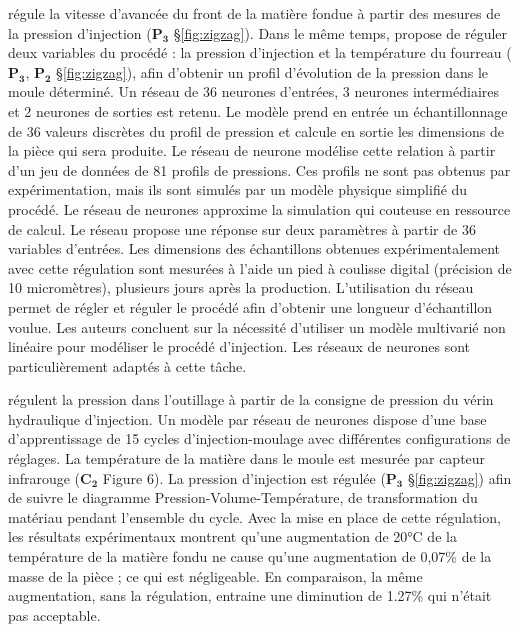 \cite{demirci_numerical_1997} régule la vitesse d'avancée du front de la matière fondue à partir des mesures de la pression d'injection ($\boldsymbol{P_3}$ §\ref{fig:zigzag}).
Dans le même temps, \cite{woll_pattern-based_1997} propose de réguler deux variables du procédé : la pression d'injection et la température du fourreau ($\boldsymbol{P_3}$, $\boldsymbol{P_2}$ §\ref{fig:zigzag}), afin d'obtenir un profil d'évolution de la pression dans le moule déterminé.
Un réseau de 36 neurones d'entrées, 3 neurones intermédiaires et 2 neurones de sorties est retenu.
Le modèle prend en entrée un échantillonnage de 36 valeurs discrètes du profil de pression et calcule en sortie les dimensions de la pièce qui sera produite.
Le réseau de neurone modélise cette relation à partir d'un jeu de données de 81 profils de pressions.
Ces profils ne sont pas obtenus par expérimentation, mais ils sont simulés par un modèle physique simplifié du procédé.
Le réseau de neurones approxime la simulation qui couteuse en ressource de calcul.
Le réseau propose une réponse sur deux paramètres à partir de 36 variables d’entrées.
Les dimensions des échantillons obtenues expérimentalement avec cette régulation sont mesurées à l’aide un pied à coulisse digital (précision de 10 micromètres), plusieurs jours après la production.
L’utilisation du réseau permet de régler et réguler le procédé afin d’obtenir une longueur d’échantillon voulue.
Les auteurs concluent sur la nécessité d’utiliser un modèle multivarié non linéaire pour modéliser le procédé d’injection.
Les réseaux de neurones sont particulièrement adaptés à cette tâche.

\cite{michaeli_online_2009} régulent la pression dans l'outillage à partir de la consigne de pression du vérin hydraulique d’injection.
Un modèle par réseau de neurones dispose d'une base d'apprentissage de 15 cycles d’injection-moulage avec différentes configurations de réglages.
La température de la matière dans le moule est mesurée par capteur infrarouge ($\boldsymbol{C_2}$ Figure 6).
La pression d'injection est régulée ($\boldsymbol{P_3}$ §\ref{fig:zigzag}) afin de suivre le diagramme Pression-Volume-Température, de transformation du matériau pendant l'ensemble du cycle.
Avec la mise en place de cette régulation, les résultats expérimentaux  montrent qu’une augmentation de 20°C de la température de la matière fondu ne cause qu'une augmentation de 0,07\% de la masse de la pièce ; ce qui est négligeable.
En comparaison, la même augmentation, sans la régulation, entraine une diminution de 1.27\% qui n'était pas acceptable.

